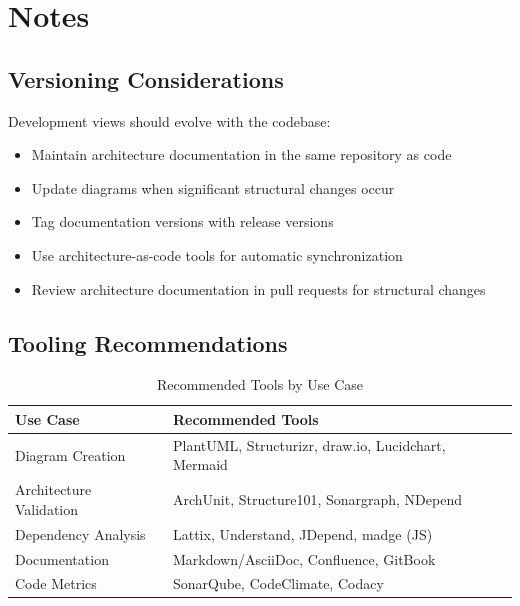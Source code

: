 \documentclass[11pt,letterpaper]{article}
\begin{document}
\section{Notes}

\subsection{Versioning Considerations}

Development views should evolve with the codebase:

\begin{itemize}
    \item Maintain architecture documentation in the same repository as code
    \item Update diagrams when significant structural changes occur
    \item Tag documentation versions with release versions
    \item Use architecture-as-code tools for automatic synchronization
    \item Review architecture documentation in pull requests for structural changes
\end{itemize}

\subsection{Tooling Recommendations}

\begin{table}[H]
\centering
\caption{Recommended Tools by Use Case}
\small
\begin{tabular}{@{}L{3.5cm}L{10cm}@{}}
\toprule
\textbf{Use Case} & \textbf{Recommended Tools} \\
\midrule
Diagram Creation & PlantUML, Structurizr, draw.io, Lucidchart, Mermaid \\
Architecture Validation & ArchUnit, Structure101, Sonargraph, NDepend \\
Dependency Analysis & Lattix, Understand, JDepend, madge (JS) \\
Documentation & Markdown/AsciiDoc, Confluence, GitBook \\
Code Metrics & SonarQube, CodeClimate, Codacy \\
\bottomrule
\end{tabular}
\end{table}
\end{document}
